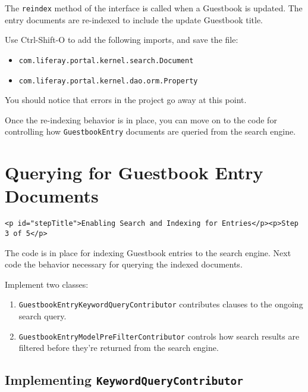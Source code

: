 The \texttt{reindex} method of the interface is called when a Guestbook
is updated. The entry documents are re-indexed to include the update
Guestbook title.

Use Ctrl-Shift-O to add the following imports, and save the file:

\begin{itemize}
\tightlist
\item
  \texttt{com.liferay.portal.kernel.search.Document}
\item
  \texttt{com.liferay.portal.kernel.dao.orm.Property}
\end{itemize}

You should notice that errors in the project go away at this point.

Once the re-indexing behavior is in place, you can move on to the code
for controlling how \texttt{GuestbookEntry} documents are queried from
the search engine.

\chapter{Querying for Guestbook Entry
Documents}\label{querying-for-guestbook-entry-documents}

\begin{verbatim}
<p id="stepTitle">Enabling Search and Indexing for Entries</p><p>Step 3 of 5</p>
\end{verbatim}

The code is in place for indexing Guestbook entries to the search
engine. Next code the behavior necessary for querying the indexed
documents.

Implement two classes:

\begin{enumerate}
\def\labelenumi{\arabic{enumi}.}
\item
  \texttt{GuestbookEntryKeywordQueryContributor} contributes clauses to
  the ongoing search query.
\item
  \texttt{GuestbookEntryModelPreFilterContributor} controls how search
  results are filtered before they're returned from the search engine.
\end{enumerate}

\section{\texorpdfstring{Implementing
\texttt{KeywordQueryContributor}}{Implementing KeywordQueryContributor}}\label{implementing-keywordquerycontributor-1}

